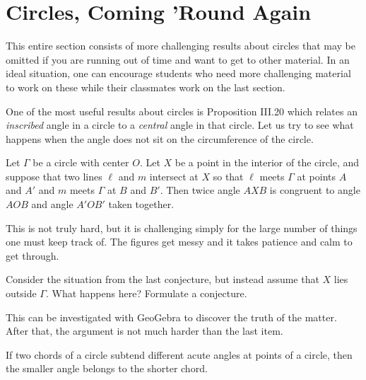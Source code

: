 \chapter{Circles, Coming 'Round Again}

\begin{annotation}
{
\color{blue}
This entire section consists of more challenging results about circles that may be omitted if you are running out of time and want to get to other material. In an ideal situation, one can encourage students who need more challenging material to work on these while their classmates
work on the last section.
}
\end{annotation}

One of the most useful results about circles is Proposition III.20 which relates an \emph{inscribed} angle in a circle to a \emph{central} angle in that circle.
Let us try to see what happens when the angle does not sit on the circumference of the circle.

\begin{conjecture}
Let $\Gamma$ be a circle with center $O$. Let $X$ be a point in the interior of the circle, and suppose that two lines $\ell$ and $m$ intersect at $X$ so that $\ell$ meets $\Gamma$ at points $A$ and $A'$ and $m$ meets $\Gamma$ at $B$ and $B'$.
Then twice angle $AXB$ is congruent to angle $AOB$ and angle $A'OB'$ taken together.
\end{conjecture}

\begin{annotation}
{
\color{blue}
This is not truly hard, but it is challenging simply for the large number of things one must keep track of. The figures get messy and it takes patience and calm to get through.
}
\end{annotation}

\begin{question}
Consider the situation from the last conjecture, but instead assume that $X$ lies outside $\Gamma$. What happens here? Formulate a conjecture.
\end{question}

\begin{annotation}
{
\color{blue}
This can be investigated with GeoGebra to discover the truth of the matter. After that, the argument is not much harder than the last item.
}
\end{annotation}

\begin{conjecture}
If two chords of a circle subtend different acute angles at points of a circle, then the smaller angle belongs to the shorter chord.
\end{conjecture}

